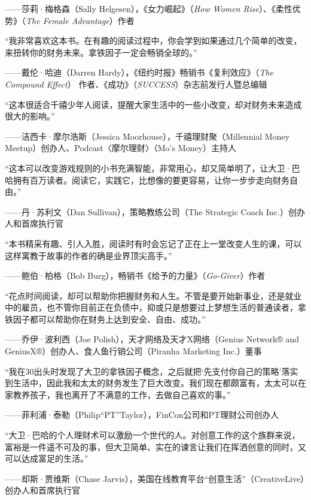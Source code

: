 {\kaishu \hfill ——莎莉·梅格森（Sally Helgesen），《女力崛起》（\textit{How Women Rise}）、《柔性优势》（\textit{The Female Advantage}）作者}\vspace{1em}

“我非常喜欢这本书。在有趣的阅读过程中，你会学到如果通过几个简单的改变，来扭转你的财务未来。拿铁因子一定会畅销全球的。”

{\kaishu \hfill ——戴伦·哈迪（Darren Hardy），《纽约时报》畅销书《复利效应》（\textit{The Compound Effect}） 作者、《成功》（\textit{SUCCESS}）杂志前发行人暨总编辑}\vspace{1em}

“这本很适合千禧少年人阅读，提醒大家生活中的一些小改变，却对财务未来造成很大的影响。”

{\kaishu \hfill ——洁西卡·摩尔浩斯（Jessica Moorhouse），千禧理财聚（Millennial Money Meetup）创办人、Podcast〈摩尔理财〉（Mo's Money）主持人}\vspace{1em}

“这本可以改变游戏规则的小书充满智能，非常用心，却又简单明了，让大卫·巴哈拥有百万读者。阅读它，实践它，比想像的要更容易，让你一步步走向财务自由。”

{\kaishu \hfill ——丹·苏利文（Dan Sullivan），策略教练公司（The Strategic Coach Inc.）创办人和首席执行官}\vspace{1em}

“本书精采有趣、引人入胜，阅读时有时会忘记了正在上一堂改变人生的课，可以这样寓教于故事的作者的确是业界顶尖高手。”

{\kaishu \hfill ——鲍伯·柏格（Bob Burg），畅销书《给予的力量》（\textit{Go-Giver}）作者}\vspace{1em}

“花点时间阅读，却可以帮助你把握财务和人生。不管是要开始新事业，还是就业中的雇员，也不管你目前正在负债中，抑或只是想要过上梦想生活的普通读者，拿铁因子都可以帮助你在财务上达到安全、自由、成功。”

{\kaishu \hfill ——乔伊·波利西（Joe Polish），天才网络及天才X网络（Genius Network® and GeniusX®）创办人、食人鱼行销公司（Piranha Marketing Inc.）董事}\vspace{1em}

“我在30出头时发现了大卫的拿铁因子概念，之后就把‘先支付你自己的策略’落实到生活中，因此我和太太的财务发生了巨大改变。我们现在都颇富有，太太可以在家教养孩子，我也离开了不满意的工作，去做自己喜欢的事。”

{\kaishu \hfill ——菲利浦·泰勒（Philip“PT”Taylor），FinCon公司和PT理财公司创办人}\vspace{1em}

“大卫·巴哈的个人理财术可以激励一个世代的人。对创意工作的这个族群来说，富裕是一件遥不可及的事，但大卫简单、实在的谏言让我们在挥洒创意的同时，又可以达成富足的生活。”

{\kaishu \hfill ——却斯·贾维斯（Chase Jarvis），美国在线教育平台“创意生活”（CreativeLive）创办人和首席执行官}\vspace{1em}

\clearpage
